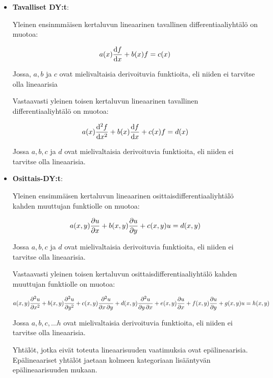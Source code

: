 \documentclass[../johdoksia.tex]{subfiles}
\begin{document}
	\begin{itemize}
		\item \textbf{Tavalliset DY:t}:
		
		Yleinen ensinmmäisen kertaluvun lineaarinen tavallinen differentiaaliyhtälö on muotoa:
		
		\begin{equation}
			a(x)\odv{f}{x} + b(x)f = c(x)
		\end{equation}
		
		Jossa, $a, b$ ja $c$ ovat mielivaltaisia derivoituvia funktioita, eli niiden ei tarvitse olla lineaarisia
		
		Vastaavasti yleinen toisen kertaluvun lineaarinen tavallinen differentiaaliyhtälö on muotoa:
		
		\begin{equation}
			a(x)\odv{^2f}{x^2} + b(x)\odv{f}{x} + c(x)f = d(x)
		\end{equation}
		
		Jossa $a, b, c$ ja $d$ ovat mielivaltaisia derivoituvia funktioita, eli niiden ei tarvitse olla lineaarisia.
		
		\item \textbf{Osittais-DY:t}:
		
		Yleinen ensimmäisen kertaluvun lineaarinen osittaisdifferentiaaliyhtälö kahden muuttujan funktiolle on muotoa:
		
		\begin{equation}
			a(x, y)\pdv{u}{x} + b(x, y)\pdv{u}{y} + c(x, y)u = d(x, y)
		\end{equation}
		
		Jossa $a, b, c$ ja $d$ ovat mielivaltaisia derivoituvia funktioita, eli niiden ei tarvitse olla lineaarisia.
		
		Vastaavasti yleinen toisen kertaluvun osittaisdifferentiaaliyhtälö kahden muuttujan funktiolle on muotoa:
		
		\begin{equation}
			a(x,y)\pdv[order = 2]{u}{x} + b(x,y)\pdv[order = 2]{u}{y} + c(x, y)\pdv{u}{x,y} + d(x, y)\pdv{u}{y,x} + e(x,y)\pdv{u}{x} + f(x, y)\pdv{u}{y} + g(x,y)u = h(x,y)
		\end{equation}
		
		Jossa $a, b, c, \dots h$ ovat mielivaltaisia derivoituvia funktioita, eli niiden ei tarvitse olla lineaarisia.
		
		Yhtälöt, jotka eivät toteuta lineaarisuuden vaatimuksia ovat epälineaarisia. Epälineaariset yhtälöt jaetaan kolmeen kategoriaan lisääntyvän epälineaarisuuden mukaan.
	\end{itemize}
	
\end{document}
